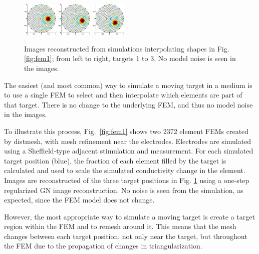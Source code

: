 \documentclass[letterpaper,twocolumn,10pt]{article}
\begin{document}
\begin{figure}[tbh]
\begin{center}
 \includegraphics[width= 0.15\textwidth]{figs/fig2a.png}
 \includegraphics[width= 0.15\textwidth]{figs/fig2b.png}
 \includegraphics[width= 0.15\textwidth]{figs/fig2c.png}
\caption{ \label{fig:fem1_images}
\small
Images reconstructed from simulations 
interpolating shapes in Fig. \ref{fig:fem1}; from
left to right, targets 1 to 3. No model noise
is seen in the images.
}
\end{center}
\vspace{-0.5cm}
\end{figure}

The easiest (and most common) way to simulate a moving target
in a medium is to use a single FEM to select and then interpolate
which elements are part of that target. There is no change to
the underlying FEM, and thus no model noise in the images.

To illustrate this process, Fig.~\ref{fig:fem1}
shows two 2372 element FEMs created by distmesh, with mesh
refinement near the electrodes. Electrodes are
simulated using a Sheffield-type adjacent stimulation and
measurement. For each simulated target position (blue), the
fraction of each element filled by the target is calculated
and used to scale the simulated conductivity change in the element.
Images are reconstructed of the three target positions
in Fig. \ref{fig:fem1_images} using a one-step regularized
GN image reconstruction. No noise is seen from the simulation,
as expected, since the FEM model does not change.

However, the most appropriate way to simulate a moving target is
create a target region within the FEM and to remesh around
it. This means that the mesh changes between each
target position, not only near the target, but throughout
the FEM due to the propagation of changes in triangularization.
\end{document}

